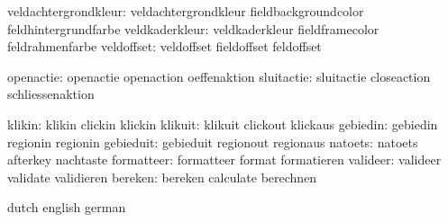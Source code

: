 veldachtergrondkleur:  veldachtergrondkleur fieldbackgroundcolor feldhintergrundfarbe
      veldkaderkleur:  veldkaderkleur       fieldframecolor      feldrahmenfarbe
          veldoffset:  veldoffset           fieldoffset          feldoffset

           openactie:  openactie            openaction           oeffenaktion 
          sluitactie:  sluitactie           closeaction          schliessenaktion

              klikin:  klikin               clickin              klickin
             klikuit:  klikuit              clickout             klickaus
            gebiedin:  gebiedin             regionin             regionin
           gebieduit:  gebieduit            regionout            regionaus
             natoets:  natoets              afterkey             nachtaste
          formatteer:  formatteer           format               formatieren
            valideer:  valideer             validate             validieren
             bereken:  bereken              calculate            berechnen

\stopconstants




\startvariables       dutch                english             german

